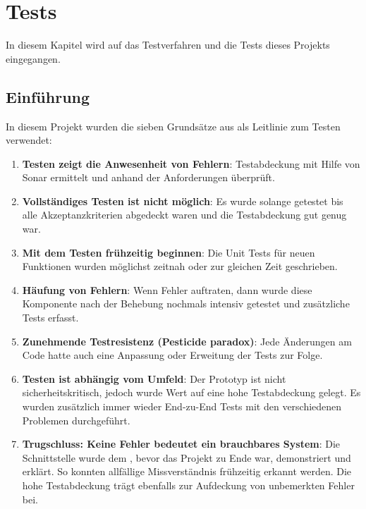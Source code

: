 %
%

\chapter{Tests \resultAssignment{[R6]}}\label{chap.tests} 
In diesem Kapitel wird auf das Testverfahren und die Tests dieses Projekts eingegangen.

\section{Einführung}
In diesem Projekt wurden die sieben Grundsätze aus \cite{test_soft_book} als Leitlinie zum Testen verwendet:
\begin{enumerate}
\item \textbf{Testen zeigt die Anwesenheit von Fehlern}: Testabdeckung mit Hilfe von Sonar ermittelt und anhand der Anforderungen überprüft.
\item \textbf{Vollständiges Testen ist nicht möglich}: Es wurde solange getestet bis alle Akzeptanzkriterien abgedeckt waren und die Testabdeckung gut genug war.
\item \textbf{Mit dem Testen frühzeitig beginnen}: Die Unit Tests für neuen Funktionen wurden möglichst zeitnah oder zur gleichen Zeit geschrieben.
\item \textbf{Häufung von Fehlern}: Wenn Fehler auftraten, dann wurde diese Komponente nach der Behebung nochmals intensiv getestet und zusätzliche Tests erfasst.
\item \textbf{Zunehmende Testresistenz (Pesticide paradox)}: Jede Änderungen am Code hatte auch eine Anpassung oder Erweitung der Tests zur Folge.
\item \textbf{Testen ist abhängig vom Umfeld}: Der Prototyp ist nicht sicherheitskritisch, jedoch wurde Wert auf eine hohe Testabdeckung gelegt. Es wurden zusätzlich immer wieder 
	End-zu-End Tests mit den verschiedenen Problemen durchgeführt.
\item \textbf{Trugschluss: Keine Fehler bedeutet ein brauchbares System}: Die Schnittstelle wurde dem , bevor das Projekt zu Ende war, demonstriert und erklärt. So 
	konnten allfällige Missverständnis frühzeitig erkannt werden. Die hohe Testabdeckung trägt ebenfalls zur Aufdeckung von unbemerkten Fehler bei.
\end{enumerate}


